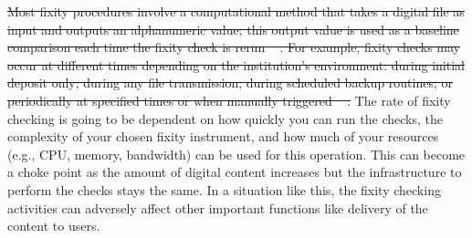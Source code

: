 \documentclass[final]{vutinfth}
\providecommand{\DIFdeltex}[1]{{\protect\color{red}\sout{#1}}}                      %
\providecommand{\DIFdelend}{} %
\providecommand{\DIFdel}[1]{\texorpdfstring{\DIFdeltex{#1}}{}} %
\begin{document}
\DIFdel{Most fixity procedures involve a computational method that takes a digital file as input and outputs an alphanumeric value; this output value is used as a baseline comparison each time the fixity check is rerun \mbox{%
\cite[5]{ndsa2017fixity}}\hskip0pt%
. 
For example, fixity checks may occur at different times depending on the institution's environment: during initial deposit only; during any file transmission; during scheduled backup routines; or periodically at specified times or when manually triggered \mbox{%
\cite[7]{ndsa2017fixity}}\hskip0pt%
.}%
\DIFdelend The rate of fixity checking is going to be dependent on how quickly you can run the checks, the complexity of your chosen fixity instrument, and how much of your resources (e.g., CPU, memory, bandwidth) can be used for this operation. This can become a choke point as the amount of digital content increases but the infrastructure to perform the checks stays the same. In a situation like this, the fixity checking activities can adversely affect other important functions like delivery of the content to users.
\end{document}
